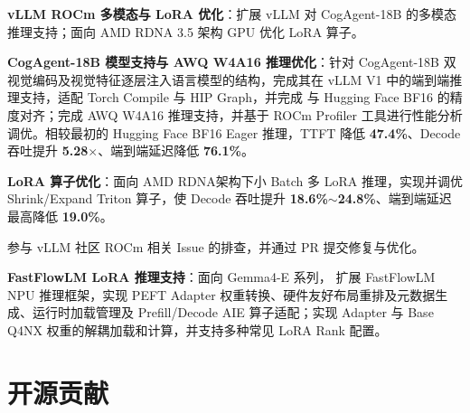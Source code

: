 \documentclass{resume}
\let\ResumeOriginalItemize\itemize
\let\ResumeOriginalEndItemize\enditemize
\renewenvironment{itemize}{%
  \ResumeOriginalItemize
  \addtolength{\topsep}{0.2em}%
  \addtolength{\itemsep}{0.2em}%
}{%
  \ResumeOriginalEndItemize
}
\begin{document}
\begin{itemize}
  \item \textbf{vLLM ROCm 多模态与 LoRA 优化}：扩展 vLLM 对
  CogAgent-18B 的多模态推理支持；面向 AMD RDNA 3.5 架构 GPU 优化 LoRA 算子。
  \begin{itemize}
      \item \textbf{CogAgent-18B 模型支持与 AWQ W4A16 推理优化}：针对
      CogAgent-18B 双视觉编码及视觉特征逐层注入语言模型的结构，完成其在
      vLLM V1 中的端到端推理支持，适配 Torch Compile 与 HIP Graph，并完成
      与 Hugging Face BF16 的精度对齐；完成 AWQ W4A16 推理支持，并基于
      ROCm Profiler 工具进行性能分析调优。相较最初的 Hugging Face BF16
      Eager 推理，TTFT 降低 \textbf{47.4\%}、Decode 吞吐提升
      \textbf{5.28$\times$}、端到端延迟降低 \textbf{76.1\%}。
    
    \item \textbf{LoRA 算子优化}：面向 AMD RDNA架构下小 Batch 多 LoRA 推理，实现并调优
    Shrink/Expand Triton 算子，使 Decode 吞吐提升
    \textbf{18.6\%$\sim$24.8\%}、端到端延迟最高降低
    \textbf{19.0\%}。

    \item 参与 vLLM 社区 ROCm 相关 Issue 的排查，并通过 PR 提交修复与优化。
  \end{itemize}

  \item \textbf{FastFlowLM LoRA 推理支持}：面向 Gemma4-E 系列，
  扩展 FastFlowLM NPU 推理框架，实现 PEFT Adapter
  权重转换、硬件友好布局重排及元数据生成、运行时加载管理及 Prefill/Decode AIE 算子适配；实现
  Adapter 与 Base Q4NX 权重的解耦加载和计算，并支持多种常见 LoRA Rank 配置。

\end{itemize}


\vspace{0.35em}
\section{开源贡献}
\end{document}
